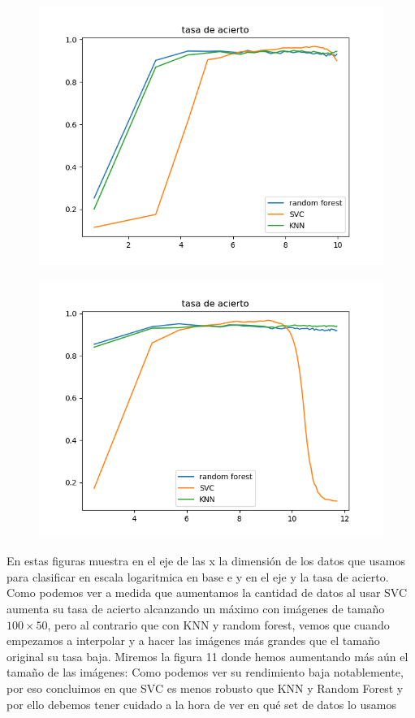 \documentclass[8pt,a4paper]{article}
\begin{document}
\begin{figure}[h]
\centering
\begin{minipage}{.5\textwidth}
  \centering
  \includegraphics[width=0.8\linewidth]{./CompararAciertos.png}
  \label{fig:test1}
\end{minipage}%
\begin{minipage}{.5\textwidth}
  \centering
  \includegraphics[width=0.8\linewidth]{./AciertosFinal.png}
  \label{fig:test2}
\end{minipage}
\end{figure}

\newpage
En estas figuras muestra en el eje de las x la dimensión de los datos que usamos para clasificar en escala logaritmica en base e y en el eje y la tasa de acierto.
Como podemos ver a medida que aumentamos la cantidad de datos al usar SVC aumenta su tasa de acierto alcanzando un máximo con imágenes de tamaño $100\times50$, pero al contrario que con KNN y random forest, vemos que cuando empezamos a interpolar y a hacer las imágenes más grandes que el tamaño original su tasa baja.
Miremos la figura 11 donde hemos aumentando más aún el tamaño de las imágenes:
Como podemos ver su rendimiento baja notablemente, por eso concluimos en que SVC es menos robusto que KNN y Random Forest y por ello debemos tener cuidado a la hora de ver en qué set de datos lo usamos
\end{document}
